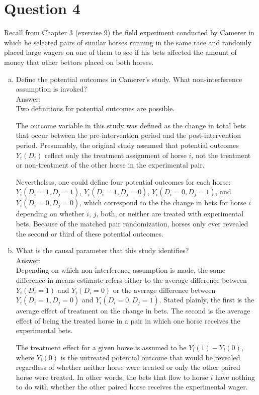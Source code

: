 \documentclass[11pt,notitlepage]{article}\usepackage[]{graphicx}\usepackage[]{color}
\begin{document}
\section*{Question 4}
Recall from Chapter 3 (exercise 9) the field experiment conducted by Camerer in which he selected pairs of similar horses running in the same race and randomly placed large wagers on one of them to see if his bets affected the amount of money that other bettors placed on both horses.
\begin{enumerate}[a)]
\item Define the potential outcomes in Camerer's study. What non-interference assumption is invoked? \\
Answer:\\
Two definitions for potential outcomes are possible.

The outcome variable in this study was defined as the change in total bets that occur between the pre-intervention period and the post-intervention period.  Presumably, the original study assumed that potential outcomes $Y_i(D_i)$ reflect only the treatment assignment of horse $i$, not the treatment or non-treatment of the other horse in the experimental pair.

Nevertheless, one could define four potential outcomes for each horse: $Y_i(D_i =1, D_j =1)$, $Y_i(D_i =1, D_j =0)$, $Y_i(D_i =0, D_j =1)$, and $Y_i(D_i =0, D_j =0)$, which correspond to the the change in bets for horse $i$ depending on whether $i$, $j$, both, or neither are treated with experimental bets.  Because of the matched pair randomization, horses only ever revealed the second or third of these potential outcomes.

\item What is the causal parameter that this study identifies? \\
Answer:\\
Depending on which non-interference assumption is made, the same difference-in-means estimate refers either to the average difference between $Y_i(D_i = 1)$ and $Y_i(D_i = 0)$ or the average difference between $Y_i(D_i =1, D_j =0)$ and $Y_i(D_i =0, D_j =1)$. Stated plainly, the first is the average effect of treatment on the change in bets.  The second is the average effect of being the treated horse in a pair in which one horse receives the experimental bets.

The treatment effect for a given horse is assumed to be $Y_i(1)-Y_i(0)$, where $Y_i(0)$ is the untreated potential outcome that would be revealed regardless of whether neither horse were treated or only the other paired horse were treated.  In other words, the bets that flow to horse $i$ have nothing to do with whether the other paired horse receives the experimental wager.
\end{enumerate}
\end{document}
